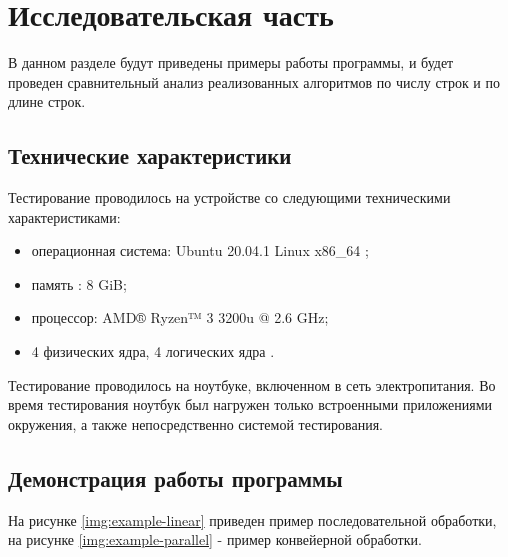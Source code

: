 \chapter{Исследовательская часть}

В данном разделе будут приведены примеры работы программы, и будет проведен сравнительный анализ реализованных алгоритмов по числу строк и по длине строк.

\section{Технические характеристики}

Тестирование проводилось на устройстве со следующими техническими характеристиками:

\begin{itemize}
	\item операционная система: Ubuntu 20.04.1 Linux x86\_64 \cite{linux};
	\item память : 8 GiB;
	\item процессор: AMD® Ryzen™ 3 3200u @ 2.6 GHz;
	\item 4 физических ядра, 4 логических ядра \cite{amd}.
\end{itemize}

Тестирование проводилось на ноутбуке, включенном в сеть электропитания. Во время тестирования ноутбук был нагружен только встроенными приложениями окружения, а также непосредственно системой тестирования.

\clearpage

\section{Демонстрация работы программы}

На рисунке \ref{img:example-linear} приведен пример последовательной обработки, на рисунке \ref{img:example-parallel} - пример конвейерной обработки.

